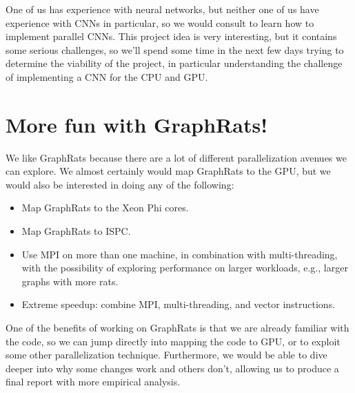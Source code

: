 \documentclass[11pt]{article} %
\begin{document}
One of us has experience with neural networks, but neither one of us have
experience with CNNs in particular, so we would consult \cite{DL,PDDL,DBLP,Dean}
to learn how to implement parallel CNNs. This project idea is very interesting,
but it contains some serious challenges, so we'll spend some time in the next
few days trying to determine the viability of the project, in particular
understanding the challenge of implementing a CNN for the CPU and GPU.

\section*{More fun with GraphRats!}

We like GraphRats because there are a lot of different parallelization avenues
we can explore. We almost certainly would map GraphRats to the GPU, but we would
also be interested in doing any of the following:

\begin{itemize}
\item
Map GraphRats to the Xeon Phi cores.
\item
Map GraphRats to ISPC.
\item
Use MPI on more than one machine, in combination with multi-threading, with the
possibility of exploring performance on larger workloads, e.g., larger graphs
with more rats.
\item
Extreme speedup: combine MPI, multi-threading, and vector instructions.
\end{itemize}

One of the benefits of working on GraphRats is that we are already familiar with
the code, so we can jump directly into mapping the code to GPU, or to exploit
some other parallelization technique. Furthermore, we would be able to dive
deeper into why some changes work and others don't, allowing us to produce a
final report with more empirical analysis.

\printbibliography
\end{document}
